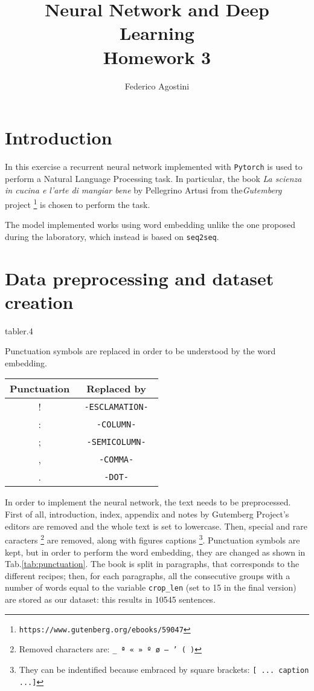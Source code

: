 \documentclass[a4paper,11pt]{article}
\title{Neural Network and Deep Learning \\ Homework 3}
\author{Federico Agostini}
\date{}
\begin{document}
\maketitle

\section{Introduction}
In this exercise a recurrent neural network implemented with \texttt{Pytorch} is used to perform a Natural Language Processing task. In particular, the book \emph{La scienza in cucina e l'arte di mangiar bene} by Pellegrino Artusi from the\emph{Gutemberg} project \footnote{\texttt{https://www.gutenberg.org/ebooks/59047}} is chosen to perform the task.

The model implemented works using word embedding unlike the one proposed during the laboratory, which instead is based on \texttt{seq2seq}.

\section{Data preprocessing and dataset creation}

\begin{wrapfloat}{table}{r}{.4\textwidth}
    \caption{Punctuation symbols are replaced in order to be understood by the word embedding.}
    \label{tab:punctuation}
    \begin{tabular}{cc}
        \toprule
        Punctuation & Replaced by \\
        \midrule
        ! & \texttt{ -ESCLAMATION- } \\
        : & \texttt{ -COLUMN- } \\
        ; & \texttt{ -SEMICOLUMN- } \\
        , & \texttt{ -COMMA- } \\
        . & \texttt{ -DOT- } \\
        \bottomrule
    \end{tabular}
\end{wrapfloat}

In order to implement the neural network, the text needs to be preprocessed. First of all, introduction, index, appendix and notes by Gutemberg Project's editors are removed and the whole text is set to lowercase. Then, special and rare caracters \footnote{Removed characters are: \texttt{\_ ª « » º ø — ' ( )}} are removed, along with figures captions \footnote{They can be indentified because embraced by square brackets: \texttt{[ ... caption ...]}}. Punctuation symbols are kept, but in order to perform the word embedding, they are changed as shown in Tab.\ref{tab:punctuation}. The book is split in paragraphs, that corresponds to the different recipes; then, for each paragraphs, all the consecutive groups with a number of words equal to the variable \texttt{crop\_len} (set to 15 in the final version) are stored as our dataset: this results in 10545 sentences.
\end{document}
